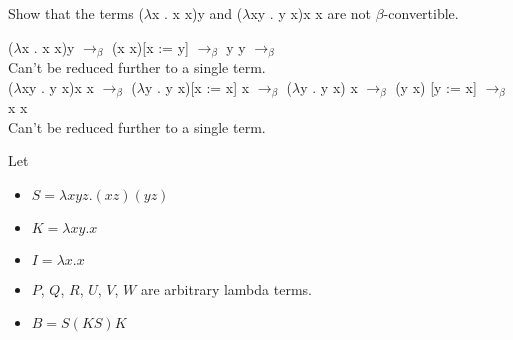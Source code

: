 \documentclass[12pt]{exam}
\begin{document}
\begin{questions}

	\question

	\question

	\question
        Show that the terms ($\lambda$x . x x)y and ($\lambda$xy . y x)x x are not $\beta$-convertible.
        \begin{solution}
        
            ($\lambda$x . x x)y $\rightarrow_{\beta}$ (x x)[x := y] $\rightarrow_{\beta}$ y y $\rightarrow_{\beta}$ \\
            Can't be reduced further to a single term.\\
            ($\lambda$xy . y x)x x $\rightarrow_{\beta}$ ($\lambda$y . y x)[x := x] x $\rightarrow_{\beta}$ ($\lambda$y . y x) x  $\rightarrow_{\beta}$ (y x) [y := x] $\rightarrow_{\beta}$ x x\\
            Can't be reduced further to a single term.
            
        \end{solution}
	\question
	Let
	\begin{itemize}
		\item $S = \lambda x y z. (x z) (y z)$
		\item $K = \lambda x y. x$
		\item $I = \lambda x. x$
		\item $P$, $Q$, $R$, $U$, $V$, $W$ are arbitrary lambda terms.
		\item $B = S (K S) K$
	\end{itemize}


\end{questions}
\end{document}
